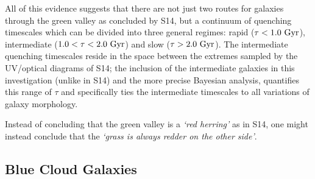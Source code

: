 All of this evidence suggests that there are not just two routes for galaxies through the green valley as concluded by S14, but a continuum of quenching timescales which can be divided into three general regimes: rapid ($\tau < 1.0 ~\rm{Gyr}$), intermediate ($1.0 < \tau < 2.0~\rm{Gyr}$) and slow ($\tau > 2.0~\rm{Gyr}$). The intermediate quenching timescales reside in the space between the extremes sampled by the UV/optical diagrams of S14; the inclusion of the intermediate galaxies in this investigation (unlike in S14) and the more precise Bayesian analysis, quantifies this range of $\tau$ and specifically ties the intermediate timescales to all variations of galaxy morphology.

Instead of concluding that the green valley is a \emph{`red herring'} as in S14, one might instead conclude that the \emph{`grass is always redder on the other side'}.


\subsection{Blue Cloud Galaxies}\label{bc}

